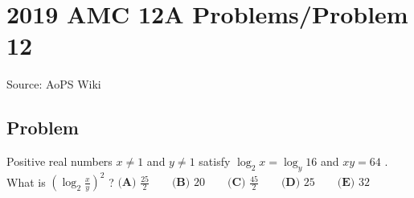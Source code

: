 \documentclass[12pt]{article}
\begin{document}
\section*{{2019 AMC 12A Problems/Problem 12}}
Source: AoPS Wiki

\subsection*{Problem}
Positive real numbers $x \neq 1$ and $y \neq 1$ satisfy $\log_2{x} = \log_y{16}$ and $xy = 64$ . What is $(\log_2{\tfrac{x}{y}})^2$ ? $\textbf{(A) } \frac{25}{2} \qquad\textbf{(B) } 20 \qquad\textbf{(C) } \frac{45}{2} \qquad\textbf{(D) } 25 \qquad\textbf{(E) } 32$
\end{document}
